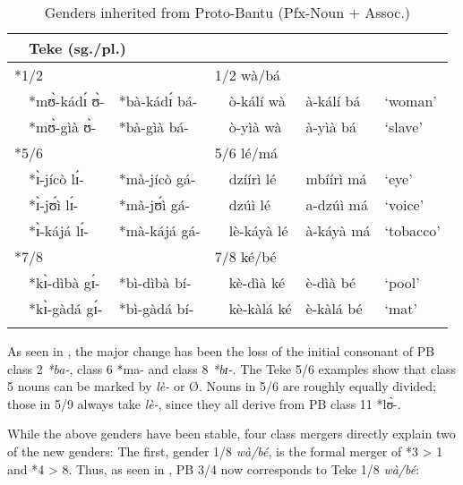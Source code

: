 \documentclass[output=paper,,modfonts,nonflat]{langsci/langscibook}
\begin{document}
\begin{table}[!htbp]
\caption{Genders inherited from Proto-Bantu (Pfx-Noun + Assoc.)}
\label{table6}
\begin{small}
\begin{tabular}{l		l l l  		l		l		l}
  \lsptoprule
\multicolumn{3}{l}{PB (sg./pl.)}					&	\multicolumn{2}{l}{Teke (sg./pl.)}					&		\\	
\midrule
\multicolumn{2}{l}{*1/2}			&		&	\multicolumn{2}{l}{1/2 wà/bá}			&		&		\\	
	&	*mʊ̀-kádɪ́ ʊ̀-	&	*bà-kádɪ́ bá-	&		&	ò-kálí wà	&	à-kálí bá	&	`woman’	\\	
	&	*mʊ̀-gìà ʊ̀-	&	*bà-gìà bá-	&		&	ò-yìà wà	&	à-yìà bá	&	`slave’	\\	[0.2cm]
\multicolumn{2}{l}{*5/6}			&		&	\multicolumn{2}{l}{5/6 lé/má}			&		&		\\	
	&	*ɪ̀-jícò lɪ́-	&	*mà-jícò gá-	&		&	dzíírì lé	&	mbíírì má	&	`eye’	\\	
	&	*ɪ̀-jʊ́ì lɪ́-	&	*mà-jʊ́ì gá-	&		&	dzúì lé	&	a-dzúì má	&	`voice’	\\	
	&	*ɪ̀-kájá lɪ́-	&	*mà-kájá gá-	&		&	lè-káyà lé	&	à-káyà má	&	`tobacco’	\\	[0.2cm]
\multicolumn{2}{l}{*7/8}			&		&	\multicolumn{2}{l}{7/8 ké/bé}			&		&		\\	
	&	*kɪ̀-dìbà gɪ́-	&	*bì-dìbà bí-	&		&	kè-dìà ké	&	è-dìà bé	&	`pool’	\\	
	&	*kɪ̀-gàdá gɪ́-	&	*bì-gàdá bí-	&		&	kè-kàlá ké	&	è-kàlá bé	&	`mat’	\\	
  \lspbottomrule
\end{tabular}
\end{small}
\end{table}

As seen in , the major change has been the loss of the initial consonant of PB class 2 \textit{*ba-}, class 6 *ma- and class 8 \textit{*bɪ-}. The Teke 5/6 examples show that class 5 nouns can be marked by \textit{lè-} or Ø. Nouns in 5/6 are roughly equally divided; those in 5/9 always take \textit{lè-}, since they all derive from PB class 11 *lʊ̀-.

While the above genders have been stable, four class mergers directly explain two of the new genders: The first, gender 1/8 \textit{wà/bé}, is the formal merger of *3 > 1 and *4 > 8. Thus, as seen in , PB 3/4 now corresponds to Teke 1/8 \textit{wà/bé}:
\end{document}
